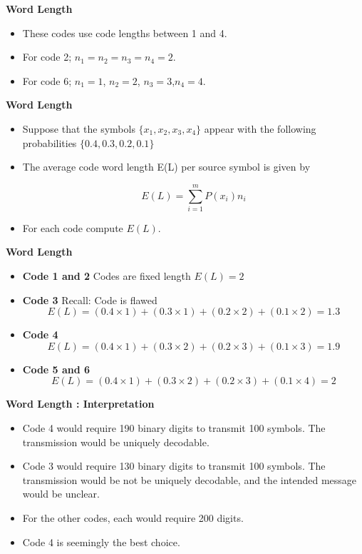 \documentclass[a4]{beamer}
\begin{document}
\medskip
\noindent \textbf{Word Length}
\begin{itemize}
\item These codes use code lengths between 1 and 4.
\item For code 2; $n_1 = n_2 = n_3 = n_4 = 2$.
\item For code 6; $n_1 = 1$, $n_2 = 2$, $n_3 = 3$,$n_4 = 4$.
\end{itemize}

\medskip
\noindent \textbf{Word Length}
\begin{itemize}
\item Suppose that the symbols $\{x_1, x_2, x_3, x_4\}$ appear with the following probabilities $\{0.4, 0.3, 0.2, 0.1\}$
\item The average code word length E(L) per source symbol is given by

\[ E(L) = \sum ^{m}_{i=1} P(x_i) n_i \]
\item For each code compute $E(L)$.
\end{itemize}


\medskip
\noindent \textbf{Word Length}
\begin{itemize}
\item \textbf{Code 1 and 2} Codes are fixed length $ E(L) = 2 $
\item \textbf{Code 3} Recall: Code is flawed \[ E(L) = (0.4 \times 1)+(0.3 \times 1)+(0.2 \times 2)+(0.1 \times 2) = 1.3 \]
\item \textbf{Code 4 } \[ E(L) = (0.4 \times 1)+(0.3 \times 2)+(0.2 \times 3)+(0.1 \times 3) = 1.9 \]
\item \textbf{Code 5 and 6} \[ E(L) = (0.4 \times 1)+(0.3 \times 2)+(0.2 \times 3)+(0.1 \times 4) = 2 \]
\end{itemize}


\medskip
\noindent \textbf{Word Length : Interpretation}
\begin{itemize}
\item Code 4 would require 190 binary digits to transmit 100 symbols. The transmission would be uniquely decodable.
\item Code 3 would require 130 binary digits to transmit 100 symbols. The transmission would be not be uniquely decodable, and the intended message would be unclear.
\item For the other codes, each would require 200 digits.
\item Code 4 is seemingly the best choice.
\end{itemize}
\end{document}
